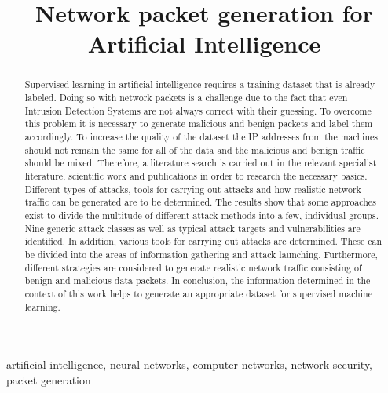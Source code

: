 \documentclass[conference]{IEEEtran}
\begin{document}
\title{Network packet generation for Artificial Intelligence\\
}

\author{
\and
{}
}

\maketitle

\begin{abstract}
Supervised learning in artificial intelligence requires a training dataset that is already labeled. Doing so with network packets is a challenge due to the fact that even Intrusion Detection Systems are not always correct with their guessing. To overcome this problem it is necessary to generate malicious and benign packets and label them accordingly. To increase the quality of the dataset the IP addresses from the machines should not remain the same for all of the data and the malicious and benign traffic should be mixed. Therefore, a literature search is carried out in the relevant specialist literature, scientific work and publications in order to research the necessary basics. Different types of attacks, tools for carrying out attacks and how realistic network traffic can be generated are to be determined. The results show that some approaches exist to divide the multitude of different attack methods into a few, individual groups. Nine generic attack classes as well as typical attack targets and vulnerabilities are identified. In addition, various tools for carrying out attacks are determined. These can be divided into the areas of information gathering and attack launching. Furthermore, different strategies are considered to generate realistic network traffic consisting of benign and malicious data packets. In conclusion, the information determined in the context of this work helps to generate an appropriate dataset for supervised machine learning.
\end{abstract}

\begin{IEEEkeywords}
artificial intelligence, neural networks, computer networks, network security, packet generation
\end{IEEEkeywords}
\end{document}
